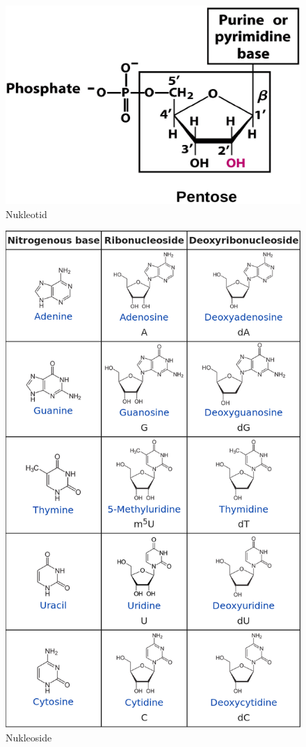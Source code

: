 \documentclass[a4paper,twocolumn,english,fontsize=7,DIV=16]{scrartcl}
\begin{document}
\begin{figure}
	\centering
	\includegraphics[width=\linewidth]{img/nukleotid.png}
	\caption{Nukleotid}
\end{figure}

\begin{figure}
	\centering
	\includegraphics[width=\linewidth]{img/nukleoside.png}
	\caption{Nukleoside}
\end{figure}
\end{document}
